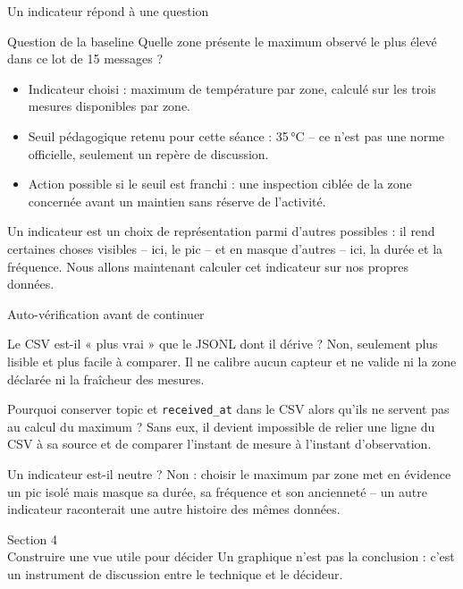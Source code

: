 \documentclass[aspectratio=169]{beamer}
\begin{document}
\begin{frame}{Un indicateur répond à une question}
  \begin{block}{Question de la baseline}
    Quelle zone présente le maximum observé le plus élevé dans ce lot de 15 messages ?
  \end{block}
  \begin{itemize}
    \item Indicateur choisi : maximum de température par zone, calculé sur les trois mesures disponibles par zone.
    \item Seuil pédagogique retenu pour cette séance : 35\,°C -- ce n'est pas une norme officielle, seulement un repère de discussion.
    \item Action possible si le seuil est franchi : une inspection ciblée de la zone concernée avant un maintien sans réserve de l'activité.
  \end{itemize}
  \alert{Un indicateur est un choix de représentation parmi d'autres possibles : il rend certaines choses visibles -- ici, le pic -- et en masque d'autres -- ici, la durée et la fréquence. Nous allons maintenant calculer cet indicateur sur nos propres données.}
\end{frame}

\begin{frame}{Auto-vérification avant de continuer}
  \small
  \begin{block}{Le CSV est-il « plus vrai » que le JSONL dont il dérive ?}
    Non, seulement plus lisible et plus facile à comparer. Il ne calibre aucun capteur et ne valide ni la zone déclarée ni la fraîcheur des mesures.
  \end{block}
  \begin{block}{Pourquoi conserver topic et \texttt{received\_at} dans le CSV alors qu'ils ne servent pas au calcul du maximum ?}
    Sans eux, il devient impossible de relier une ligne du CSV à sa source et de comparer l'instant de mesure à l'instant d'observation.
  \end{block}
  \begin{block}{Un indicateur est-il neutre ?}
    Non : choisir le maximum par zone met en évidence un pic isolé mais masque sa durée, sa fréquence et son ancienneté -- un autre indicateur raconterait une autre histoire des mêmes données.
  \end{block}
\end{frame}

\begin{frame}[plain]
  \centering
  \Huge Section 4\\[3mm]
  \Large Construire une vue utile pour décider
  \vfill
  \normalsize Un graphique n'est pas la conclusion : c'est un instrument de discussion entre le technique et le décideur.
\end{frame}
\end{document}

